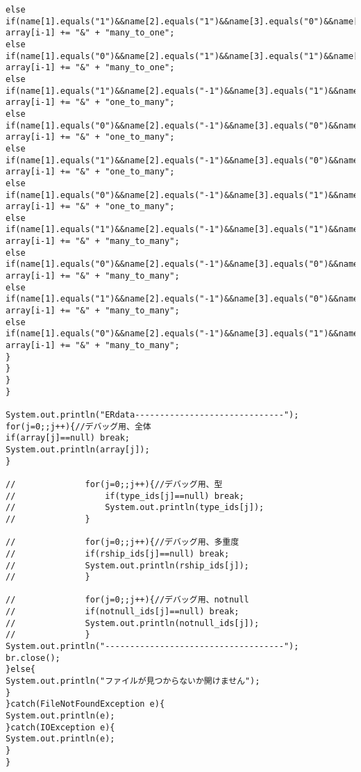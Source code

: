 \documentclass{funthesis}
\begin{document}
\begin{lstlisting}[caption=LoadER.java,label=1]
else if(name[1].equals("1")&&name[2].equals("1")&&name[3].equals("0")&&name[4].equals("-1")) array[i-1] += "&" + "many_to_one";
else if(name[1].equals("0")&&name[2].equals("1")&&name[3].equals("1")&&name[4].equals("-1")) array[i-1] += "&" + "many_to_one";
else if(name[1].equals("1")&&name[2].equals("-1")&&name[3].equals("1")&&name[4].equals("1")) array[i-1] += "&" + "one_to_many";
else if(name[1].equals("0")&&name[2].equals("-1")&&name[3].equals("0")&&name[4].equals("1")) array[i-1] += "&" + "one_to_many";
else if(name[1].equals("1")&&name[2].equals("-1")&&name[3].equals("0")&&name[4].equals("1")) array[i-1] += "&" + "one_to_many";
else if(name[1].equals("0")&&name[2].equals("-1")&&name[3].equals("1")&&name[4].equals("1")) array[i-1] += "&" + "one_to_many";
else if(name[1].equals("1")&&name[2].equals("-1")&&name[3].equals("1")&&name[4].equals("-1")) array[i-1] += "&" + "many_to_many";
else if(name[1].equals("0")&&name[2].equals("-1")&&name[3].equals("0")&&name[4].equals("-1")) array[i-1] += "&" + "many_to_many";
else if(name[1].equals("1")&&name[2].equals("-1")&&name[3].equals("0")&&name[4].equals("-1")) array[i-1] += "&" + "many_to_many";
else if(name[1].equals("0")&&name[2].equals("-1")&&name[3].equals("1")&&name[4].equals("-1")) array[i-1] += "&" + "many_to_many";
}
}
}
}

System.out.println("ERdata------------------------------");
for(j=0;;j++){//デバッグ用、全体
if(array[j]==null) break;
System.out.println(array[j]);
}

//				for(j=0;;j++){//デバッグ用、型
//					if(type_ids[j]==null) break;
//					System.out.println(type_ids[j]);
//				}

//				for(j=0;;j++){//デバッグ用、多重度
//				if(rship_ids[j]==null) break;
//				System.out.println(rship_ids[j]);
//				}

//				for(j=0;;j++){//デバッグ用、notnull
//				if(notnull_ids[j]==null) break;
//				System.out.println(notnull_ids[j]);
//				}
System.out.println("------------------------------------");
br.close();
}else{
System.out.println("ファイルが見つからないか開けません");
}
}catch(FileNotFoundException e){
System.out.println(e);
}catch(IOException e){
System.out.println(e);
}
}


\end{lstlisting}
\end{document}
